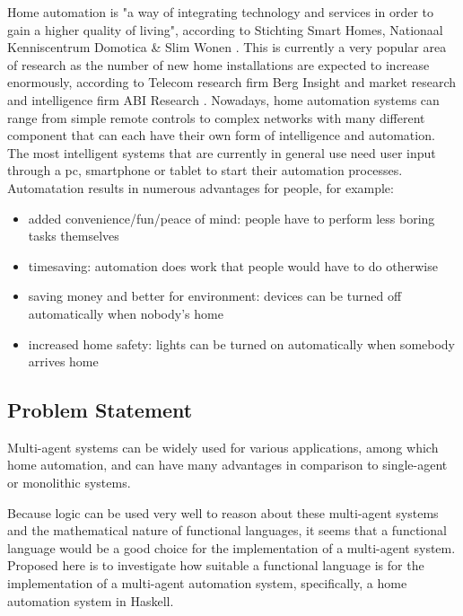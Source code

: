 \documentclass{sig-alternate-br}
\begin{document}
Home automation is "a way of integrating technology and services in order to gain a higher quality of living", according to Stichting Smart Homes, Nationaal Kenniscentrum Domotica \& Slim Wonen \cite{ssh}. This is currently a very popular area of research as the number of new home installations are expected to increase enormously, according to Telecom research firm Berg Insight \cite{berginsight} and market research and intelligence firm ABI Research \cite{abi}. Nowadays, home automation systems can range from simple remote controls to complex networks with many different component that can each have their own form of intelligence and automation. The most intelligent systems that are currently in general use need user input through a pc, smartphone or tablet to start their automation processes. Automatation results in numerous advantages for people, for example:
\begin{itemize}
\item added convenience/fun/peace of mind: people have to perform less boring tasks themselves
\item timesaving: automation does work that people would have to do otherwise
\item saving money and better for environment: devices can be turned off automatically when nobody's home
\item increased home safety: lights can be turned on automatically when somebody arrives home
\end{itemize}
\subsection{Problem Statement}
Multi-agent systems can be widely used for various applications, among which home automation, and can have many advantages in comparison to single-agent or monolithic systems. %

Because logic can be used very well to reason about these multi-agent systems \cite{b:rara1112} and the mathematical nature of functional languages, it seems that a functional language would be a good choice for the implementation of a multi-agent system. Proposed here is to investigate how suitable a functional language is for the implementation of a multi-agent automation system, specifically, a home automation system in Haskell.

\end{document}
